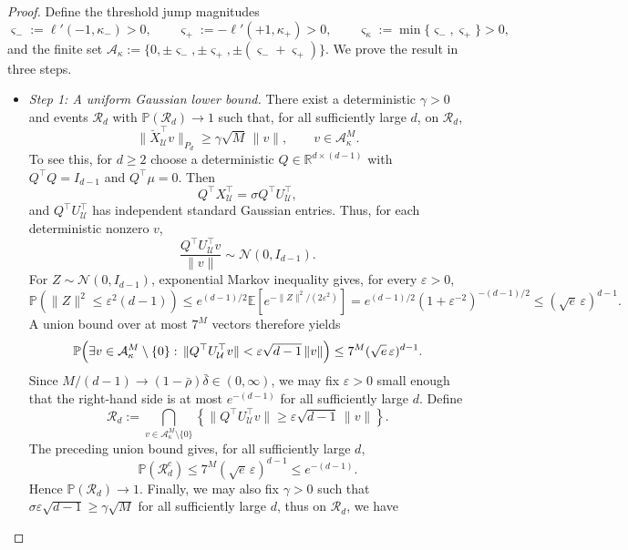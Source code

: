 \begin{proof}
Define the threshold jump magnitudes
\[
    \varsigma_-:=\ell'(-1,\kappa_-)>0,\qquad
    \varsigma_+:=-\ell'(+1,\kappa_+)>0,\qquad
    \varsigma_\kappa:=\min\{\varsigma_-,\varsigma_+\}>0,
\]
and the finite set
$\mathcal A_\kappa:=\{0,\pm \varsigma_-,\pm \varsigma_+,\pm(\varsigma_-+\varsigma_+)\}$.
We prove the result in three steps.

\begin{itemize}[wide]
    \item \emph{Step 1: A uniform Gaussian lower bound.}
There exist a deterministic $\gamma>0$ and events
$\mathcal R_d$ with $\mathbb P(\mathcal R_d)\to1$ such that,
for all sufficiently large $d$, on $\mathcal R_d$,
\begin{equation}
    \|\breve X_{\mathcal U}^{\top}v\|_{P_d}
    \geq\gamma\sqrt M\,\|v\|,
    \qquad v\in\mathcal A_\kappa^M.
    \label{eq:configuration-switching-gaussian-bound}
\end{equation}
To see this, for $d\geq2$ choose a deterministic
$Q\in\mathbb R^{d\times(d-1)}$ with
$Q^\top Q=I_{d-1}$ and $Q^\top\mu=0$. Then
\[
    Q^\top X_{\mathcal U}^{\top}
    =\sigma Q^\top U_{\mathcal U}^{\top},
\]
and $Q^\top U_{\mathcal U}^{\top}$ has independent standard
Gaussian entries. Thus, for each deterministic nonzero $v$,
\[
    \frac{Q^\top U_{\mathcal U}^{\top}v}{\|v\|}
    \sim\mathcal N(0,I_{d-1}).
\]
For $Z\sim\mathcal N(0,I_{d-1})$, exponential Markov inequality
gives, for every $\varepsilon>0$,
\[
    \mathbb P(\|Z\|^2\leq\varepsilon^2(d-1))
    \leq e^{(d-1)/2}
       \mathbb E[e^{-\|Z\|^2/(2\varepsilon^2)}]
    =e^{(d-1)/2}(1+\varepsilon^{-2})^{-(d-1)/2}
      \leq(\sqrt e\,\varepsilon)^{d-1}.
\]
A union bound over at most $7^M$ vectors therefore yields
\[
\begin{split}
    \mathbb P\Bigl(
        \exists v\in\mathcal A_\kappa^M\setminus\{0\}:\,
        \|Q^\top U_{\mathcal U}^{\top}v\|
        <\varepsilon\sqrt{d-1}\,\|v\|
    \Bigr)
    \leq7^M(\sqrt e\,\varepsilon)^{d-1}.
\end{split}
\]
Since $M/(d-1)\to(1-\bar\rho)\bar\delta\in(0,\infty)$,
we may fix $\varepsilon>0$ small enough that the right-hand
side is at most $e^{-(d-1)}$ for all sufficiently large $d$.
Define
\[
    \mathcal R_d
    :=
    \bigcap_{v\in\mathcal A_\kappa^M\setminus\{0\}}
    \left\{
        \|Q^\top U_{\mathcal U}^{\top}v\|
        \geq\varepsilon\sqrt{d-1}\,\|v\|
    \right\}.
\]
The preceding union bound gives, for all sufficiently large $d$,
\[
    \mathbb P(\mathcal R_d^c)
    \leq 7^M(\sqrt e\,\varepsilon)^{d-1}
    \leq e^{-(d-1)}.
\]
Hence $\mathbb P(\mathcal R_d)\to1$.
Finally, we may also fix $\gamma>0$ such that
$\sigma\varepsilon\sqrt{d-1}\geq\gamma\sqrt M$ for all
sufficiently large $d$, thus on $\mathcal{R}_d$, we have


\end{itemize}
\end{proof}
